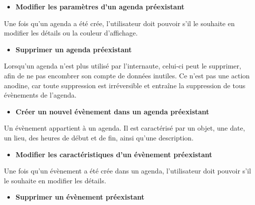 \documentclass[12pt , a4paper]{article}
\begin{document}
\vspace{0.5cm}
\begin{itemize}
\item \textbf{Modifier les param\`etres d{\textquoteright}un agenda
    pr\'eexistant}
\end{itemize}
Une fois qu{\textquoteright}un agenda a \'et\'e cr\'ee,
l{\textquoteright}utilisateur doit pouvoir s{\textquoteright}il le
souhaite en modifier les d\'etails ou la couleur
d{\textquoteright}affichage.

\vspace{0.5cm}
\begin{itemize}
\item \textbf{Supprimer un agenda pr\'eexistant}
\end{itemize}
Lorsqu{\textquoteright}un agenda n{\textquoteright}est plus utilis\'e
par l{\textquoteright}internaute, celui-ci peut le supprimer, afin de
ne pas encombrer son compte de donn\'ees inutiles. Ce
n{\textquoteright}est pas une action anodine, car toute suppression est
irr\'eversible et entra\^ine la suppression de tous \'ev\`enements de
l{\textquoteright}agenda.

\vspace{0.5cm}
\begin{itemize}
\item \textbf{Cr\'eer un nouvel \'ev\`enement dans un agenda
    pr\'eexistant}
\end{itemize}
Un \'ev\`enement appartient \`a un agenda. Il est caract\'eris\'e par un
objet, une date, un lieu, des heures de d\'ebut et de fin, ainsi
qu{\textquoteright}une description.

\vspace{0.5cm}
\begin{itemize}
\item \textbf{Modifier les caract\'eristiques d{\textquoteright}un
    \'ev\`enement pr\'eexistant}
\end{itemize}
Une fois qu{\textquoteright}un \'ev\`enement a \'et\'e cr\'ee dans un
agenda, l{\textquoteright}utilisateur doit pouvoir s{\textquoteright}il
le souhaite en modifier les d\'etails.

\vspace{0.5cm}
\begin{itemize}
\item \textbf{Supprimer un \'ev\`enement pr\'eexistant}
\end{itemize}
\end{document}
